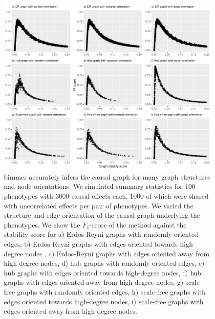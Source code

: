 \documentclass{article}
\begin{document}
\newpage
\begin{figure}[H]\label{figureS3}
\includegraphics[width=\textwidth]{figures/figure_S3.png}
\caption{bimmer accurately infers the causal graph for many graph structures and node
orientations. We simulated summary statistics for $100$ phenotypes with $3000$ causal
effects each, $1000$ of which were shared with uncorrelated effects per pair of phenotypes.
We varied the structure and edge orientation of the causal graph underlying the phenotypes.
We show the $F_1$-score of the method against the stability score for a) Erdos Reyni graphs
with randomly oriented edges, b) Erdos-Reyni graphs with edges oriented towards high-degree nodes
, c) Erdos-Reyni graphs with edges oriented away from high-degree nodes, d)
hub graphs with randomly oriented edges, e) hub graphs with edges oriented towards high-degree
 nodes, f) hub graphs with edges oriented away from high-degree nodes, g)
scale-free graphs with randomly oriented edges, h) scale-free graphs with edges oriented towards
 high-degree  nodes, i) scale-free graphs with edges oriented away from high-degree nodes. }
\end{figure}
\end{document}
